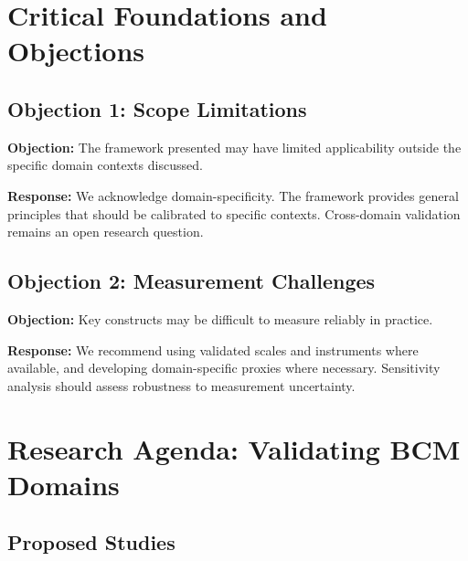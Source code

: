 \section{Critical Foundations and Objections}
\label{sec:bj-foundations}

\subsection{Objection 1: Scope Limitations}

\textbf{Objection:} The framework presented may have limited applicability
outside the specific domain contexts discussed.

\textbf{Response:} We acknowledge domain-specificity. The framework provides
general principles that should be calibrated to specific contexts. Cross-domain
validation remains an open research question.

\subsection{Objection 2: Measurement Challenges}

\textbf{Objection:} Key constructs may be difficult to measure reliably in
practice.

\textbf{Response:} We recommend using validated scales and instruments where
available, and developing domain-specific proxies where necessary. Sensitivity
analysis should assess robustness to measurement uncertainty.


\section{Research Agenda: Validating BCM Domains}
\label{sec:bj-agenda}

\subsection{Proposed Studies}


